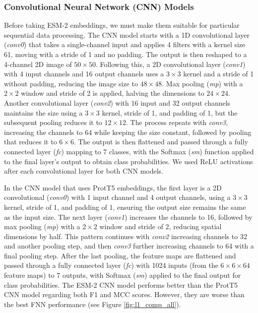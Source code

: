 \documentclass{bioinfo}
\begin{document}
\subsubsection{Convolutional Neural Network (CNN) Models}
Before taking ESM-2 embeddings, we must make them suitable for particular sequential data processing.
The CNN model starts with a 1D convolutional layer (\textit{conv0}) that takes a single-channel input and applies 4
filters with a kernel size 61, moving with a stride of 1 and no padding.
The output is then reshaped to a 4-channel 2D image of  $50\times50$. Following this, a 2D convolutional layer (\textit{conv1}) with 4 input 
channels and 16 output channels uses a $3\times3$ kernel and a stride of 1 without padding, reducing the image size to $48\times48$. 
Max pooling (\textit{mp}) with a $2\times2$ window and stride of 2 is applied, halving the dimensions to $24\times24$. 
Another convolutional layer (\textit{conv2}) with 16 input and 32 output channels maintains the size using a $3\times3$ kernel, 
stride of 1, and padding of 1, but the subsequent pooling reduces it to $12\times12$. 
The process repeats with \textit{conv3}, increasing the channels to 64 while keeping the size constant, 
followed by pooling that reduces it to $6\times6$. The output is then flattened and passed through a fully connected 
layer (\textit{fc}) mapping to 7 classes, with the Softmax (\textit{sm}) function applied to the final layer's output to obtain class probabilities. 
We used ReLU activations after each convolutional layer for both CNN models.

In the CNN model that uses ProtT5 embeddings, the first layer is a 2D convolutional (\textit{conv0}) with 1 input channel and 
4 output channels, using a $3\times3$ kernel, stride of 1, and padding of 1, ensuring the output size remains the same as the input 
size. The next layer (\textit{conv1}) increases the channels to 16, followed by max pooling (\textit{mp}) with a $2\times2$ window and stride of 2,
reducing spatial dimensions by half. This pattern continues with \textit{conv2} increasing channels to 32 and another pooling step,
and then \textit{conv3} further increasing channels to 64 with a final pooling step. After the last pooling, 
the feature maps are flattened and passed through a fully connected layer (\textit{fc}) with 1024 inputs 
(from the $6\times6\times64$ feature maps) to 7 outputs, with Softmax (\textit{sm}) applied to the final output for class 
probabilities.
The ESM-2 CNN model performs better than the ProtT5 CNN model regarding both F1 and MCC scores. 
However, they are worse than the best FNN performance (see Figure \ref{fig:l1_comp_all}). \\
\end{document}
